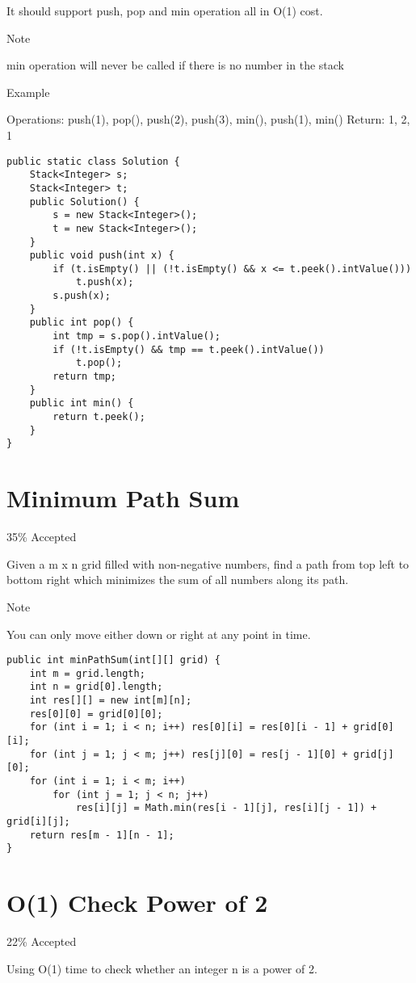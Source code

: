 \documentclass[9pt, b5paaper]{book}
\begin{document}
It should support push, pop and min operation all in O(1) cost.

Note

min operation will never be called if there is no number in the stack

Example

Operations: push(1), pop(), push(2), push(3), min(), push(1), min()
Return: 1, 2, 1
\begin{verbatim}
public static class Solution {
    Stack<Integer> s;
    Stack<Integer> t;
    public Solution() {
        s = new Stack<Integer>();
        t = new Stack<Integer>();
    }
    public void push(int x) {
        if (t.isEmpty() || (!t.isEmpty() && x <= t.peek().intValue()))
            t.push(x);
        s.push(x);
    }
    public int pop() {
        int tmp = s.pop().intValue();
        if (!t.isEmpty() && tmp == t.peek().intValue())
            t.pop();
        return tmp;
    }
    public int min() {
        return t.peek();
    }
}
\end{verbatim}
\section{Minimum Path Sum}
\label{sec-1-47}

35\% Accepted

Given a m x n grid filled with non-negative numbers, find a path from top left to bottom right which minimizes the sum of all numbers along its path.

Note

You can only move either down or right at any point in time.
\begin{verbatim}
public int minPathSum(int[][] grid) {
    int m = grid.length;
    int n = grid[0].length;
    int res[][] = new int[m][n];
    res[0][0] = grid[0][0];
    for (int i = 1; i < n; i++) res[0][i] = res[0][i - 1] + grid[0][i];
    for (int j = 1; j < m; j++) res[j][0] = res[j - 1][0] + grid[j][0];
    for (int i = 1; i < m; i++) 
        for (int j = 1; j < n; j++) 
            res[i][j] = Math.min(res[i - 1][j], res[i][j - 1]) + grid[i][j];
    return res[m - 1][n - 1];
}
\end{verbatim}
\section{O(1) Check Power of 2}
\label{sec-1-48}

22\% Accepted

Using O(1) time to check whether an integer n is a power of 2.
\end{document}

